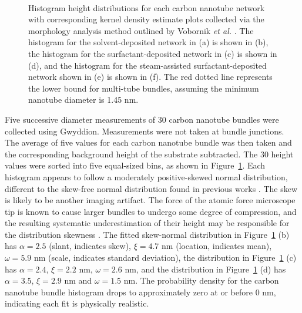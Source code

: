 \documentclass[
  a4paper,
]{scrbook}
\begin{document}
\begin{figure}
\begin{minipage}[t]{0.45\linewidth}
{{}

}

\end{minipage}%
%
\begin{minipage}[t]{0.01\linewidth}

{\centering 

~

}

\end{minipage}%

\caption{\label{fig-cnt-histogram}Histogram height distributions for
each carbon nanotube network with corresponding kernel density estimate
plots collected via the morphology analysis method outlined by Vobornik
\emph{et al.} \autocite{Vobornik2023}. The histogram for the
solvent-deposited network in (a) is shown in (b), the histogram for the
surfactant-deposited network in (c) is shown in (d), and the histogram
for the steam-assisted surfactant-deposited network shown in (e) is
shown in (f). The red dotted line represents the lower bound for
multi-tube bundles, assuming the minimum nanotube diameter is 1.45 nm.}

\end{figure}

Five successive diameter measurements of 30 carbon nanotube bundles were
collected using Gwyddion. Measurements were not taken at bundle
junctions. The average of five values for each carbon nanotube bundle
was then taken and the corresponding background height of the substrate
subtracted. The 30 height values were sorted into five equal-sized bins,
as shown in Figure~\ref{fig-cnt-histogram}. Each histogram appears to
follow a moderately positive-skewed normal distribution, different to
the skew-free normal distribution found in previous works
\autocite{LeMieux2008,Liu2013,Vobornik2023}. The skew is likely to be
another imaging artifact. The force of the atomic force microscope tip
is known to cause larger bundles to undergo some degree of compression,
and the resulting systematic underestimation of their height may be
responsible for the distribution skewness \autocite{Vobornik2023}. The
fitted skew-normal distribution in Figure~\ref{fig-cnt-histogram} (b)
has \(\alpha = 2.5\) (slant, indicates skew), \(\xi = 4.7\) nm
(location, indicates mean), \(\omega = 5.9\) nm (scale, indicates
standard deviation), the distribution in Figure~\ref{fig-cnt-histogram}
(c) has \(\alpha = 2.4\), \(\xi = 2.2\) nm, \(\omega = 2.6\) nm, and the
distribution in Figure~\ref{fig-cnt-histogram} (d) has \(\alpha = 3.5\),
\(\xi = 2.9\) nm and \(\omega = 1.5\) nm. The probability density for
the carbon nanotube bundle histogram drops to approximately zero at or
before 0 nm, indicating each fit is physically realistic.
\end{document}
